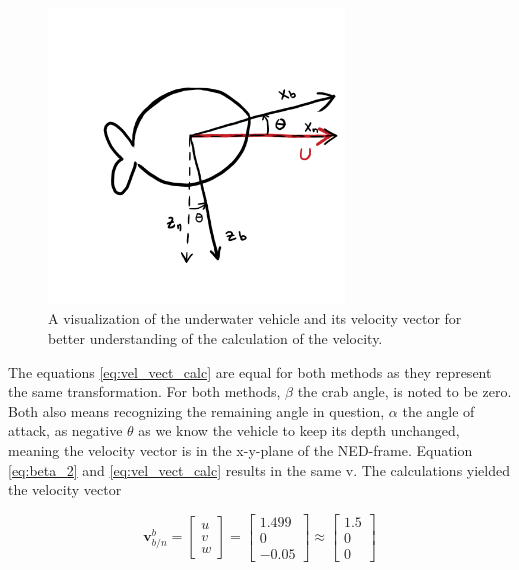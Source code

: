 \begin{figure}[!htb]
	\centering
	\includegraphics[width=0.70\textwidth]{figures/angleOfAttackImg.png}
	\caption{A visualization of the underwater vehicle and its velocity vector for better understanding of the calculation of the velocity.}
\label{fig:angleOfAttackImg}
\end{figure}

The equations \eqref{eq:vel_vect_calc} are equal for both methods as they represent the same transformation. For both methods, $\beta$ the crab angle, is noted to be zero. Both also means recognizing the remaining angle in question, $\alpha$ the angle of attack, as negative $\theta$ as we know the vehicle to keep its depth unchanged, meaning the velocity vector is in the x-y-plane of the NED-frame. Equation \eqref{eq:beta_2} and \eqref{eq:vel_vect_calc} results in the same v. The calculations yielded the velocity vector

\begin{equation}
    \mathbf{v}^b_{b/n} =
    \begin{bmatrix}
		u \\
		v \\
		w
	\end{bmatrix}
	= 
	\begin{bmatrix}
		1.499 \\
		0 \\
		-0.05	
	\end{bmatrix}
	\approx 
	\begin{bmatrix}
		1.5 \\
		0 \\
		0	
	\end{bmatrix}
\end{equation}

